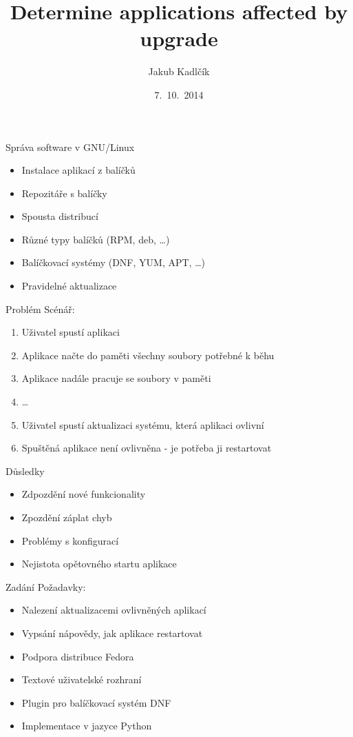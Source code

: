 \documentclass{beamer}
\title[tracer]{Determine applications affected by upgrade}
\author{Jakub Kadlčík}
\institute[UPOL]{Univerzita Palackého v Olomouci}
\date{7.~10.~2014}
\begin{document}
	\begin{frame}
		\titlepage
	\end{frame}

	\begin{frame}{Správa software v GNU/Linux}
		\begin{itemize}
			\item Instalace aplikací z balíčků
			\item Repozitáře s balíčky
			\item Spousta distribucí
			\item Různé typy balíčků (RPM, deb, \dots)
			\item Balíčkovací systémy (DNF, YUM, APT, \dots)
			\item Pravidelné aktualizace
		\end{itemize}
	\end{frame}

	\begin{frame}{Problém}
		Scénář:
		\begin{enumerate}
			\item Uživatel spustí aplikaci
			\item Aplikace načte do paměti všechny soubory potřebné k běhu
			\item Aplikace nadále pracuje se soubory v paměti
			\item \dots
			\item Uživatel spustí aktualizaci systému, která aplikaci ovlivní
			\item Spuštěná aplikace není ovlivněna - je potřeba ji restartovat
		\end{enumerate}
	\end{frame}

	\begin{frame}{Důsledky}
		\begin{itemize}
			\item Zdpozdění nové funkcionality
			\item Zpozdění záplat chyb
			\item Problémy s konfigurací
			\item Nejistota opětovného startu aplikace
		\end{itemize}
	\end{frame}

	\begin{frame}{Zadání}
		Požadavky:
		\begin{itemize}
			\item Nalezení aktualizacemi ovlivněných aplikací
			\item Vypsání nápovědy, jak aplikace restartovat
		\end{itemize}

		\begin{itemize}
			\item Podpora distribuce Fedora
			\item Textové uživatelské rozhraní
			\item Plugin pro balíčkovací systém DNF
			\item Implementace v jazyce Python
		\end{itemize}
	\end{frame}
\end{document}
